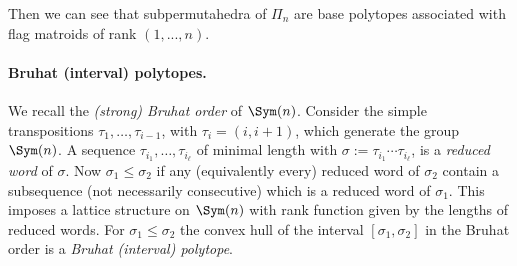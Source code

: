 Then we can see that subpermutahedra of $\Pi_{n}$ are base polytopes associated with flag matroids of rank $(1,...,n)$.

\fi



	

\paragraph*{Bruhat (interval) polytopes.}

We recall the \emph{(strong) Bruhat order} of $\Sym(n)$.
Consider the simple transpositions $\tau_1,\dots,\tau_{i-1}$, with $\tau_i = (i,i+1)$, which generate the group $\Sym(n)$.
A sequence $\tau_{i_1},\dots,\tau_{i_\ell}$ of minimal length with $\sigma:=\tau_{i_1}\cdots\tau_{i_\ell}$, is a \emph{reduced word} of $\sigma$.
Now $\sigma_1 \leq \sigma_2$ if any (equivalently every) reduced word of $\sigma_2$ contain a subsequence (not necessarily consecutive) which is a reduced word of $\sigma_1$.
This imposes a lattice structure on $\Sym(n)$ with rank function given by the lengths of reduced words.
For $\sigma_1 \leq \sigma_2$ the convex hull of the interval $[\sigma_1,\sigma_2]$ in the Bruhat order is a \emph{Bruhat (interval) polytope}. 
	

